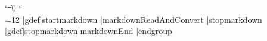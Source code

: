 %
\unprotect
\let\startmarkdown\relax
\let\stopmarkdown\relax
\def\dospecials{\do\ \do\\\do\{\do\}\do\$\do\&%
  \do\#\do\^\do\_\do\%\do\~}%

\def\markdownMakeOther{%
  \count0=128\relax
  \loop
    \catcode\count0=11\relax
    \advance\count0 by 1\relax
  \ifnum\count0<256\repeat
  \catcode`|=12}%
\def\markdownInfo#1{\writestatus{markdown}{#1.}}%
\def\markdownWarning#1{\writestatus{markdown\space warn}{#1.}}%
\begingroup
  \catcode`\|=0%
  \catcode`\\=12%
  |gdef|startmarkdown{%
    |markdownReadAndConvert{\stopmarkdown}%
                           {|stopmarkdown}}%
  |gdef|stopmarkdown{|markdownEnd}%
|endgroup
\def\markdownRendererLineBreakPrototype{\blank}%
\def\markdownRendererLeftBracePrototype{\textbraceleft}%
\def\markdownRendererRightBracePrototype{\textbraceright}%
